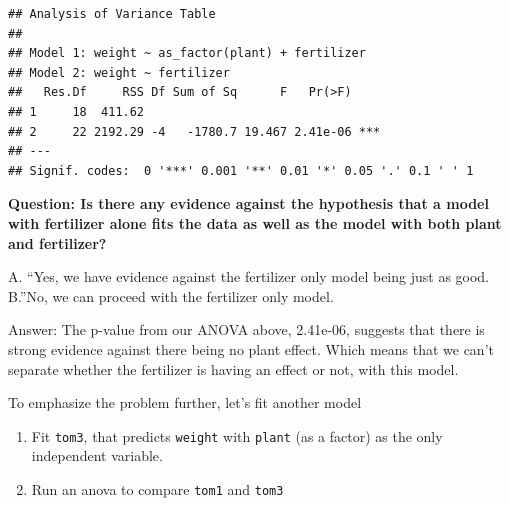 \documentclass[
  openany]{book}
\newenvironment{Shaded}{\begin{snugshade}}{\end{snugshade}}
\newcommand{\AttributeTok}[1]{\textcolor[rgb]{0.77,0.63,0.00}{#1}}
\newcommand{\DecValTok}[1]{\textcolor[rgb]{0.00,0.00,0.81}{#1}}
\newcommand{\FunctionTok}[1]{\textcolor[rgb]{0.00,0.00,0.00}{#1}}
\newcommand{\NormalTok}[1]{#1}
\newcommand{\OtherTok}[1]{\textcolor[rgb]{0.56,0.35,0.01}{#1}}
\newcommand{\SpecialCharTok}[1]{\textcolor[rgb]{0.00,0.00,0.00}{#1}}
\newcommand{\StringTok}[1]{\textcolor[rgb]{0.31,0.60,0.02}{#1}}
\providecommand{\tightlist}{%
  \setlength{\itemsep}{0pt}\setlength{\parskip}{0pt}}
\begin{document}
\begin{verbatim}
## Analysis of Variance Table
## 
## Model 1: weight ~ as_factor(plant) + fertilizer
## Model 2: weight ~ fertilizer
##   Res.Df     RSS Df Sum of Sq      F   Pr(>F)    
## 1     18  411.62                                 
## 2     22 2192.29 -4   -1780.7 19.467 2.41e-06 ***
## ---
## Signif. codes:  0 '***' 0.001 '**' 0.01 '*' 0.05 '.' 0.1 ' ' 1
\end{verbatim}

\begin{Shaded}
\end{Shaded}

\textbf{Question: Is there any evidence against the hypothesis that a model with fertilizer alone fits the data as well as the model with both plant and fertilizer?}

A. ``Yes, we have evidence against the fertilizer only model being just as good.\\
B.''No, we can proceed with the fertilizer only model.

Answer: The p-value from our ANOVA above, 2.41e-06, suggests that there is strong evidence against there being no plant effect. Which means that we can't separate whether the fertilizer is having an effect or not, with this model.

To emphasize the problem further, let's fit another model

\begin{enumerate}
\def\labelenumi{\arabic{enumi}.}
\tightlist
\item
  Fit \texttt{tom3}, that predicts \texttt{weight} with \texttt{plant} (as a factor) as the only independent variable.
\item
  Run an anova to compare \texttt{tom1} and \texttt{tom3}
\end{enumerate}
\end{document}
